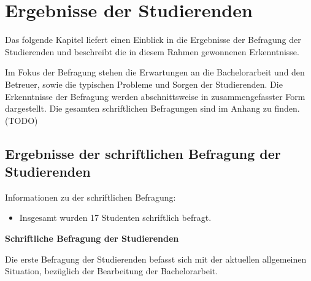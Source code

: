 \documentclass{scrreprt}
\begin{document}
\newpage
\section{Ergebnisse der Studierenden}
\par Das folgende Kapitel liefert einen Einblick in die Ergebnisse der Befragung der Studierenden und beschreibt die in diesem Rahmen gewonnenen Erkenntnisse.
\par Im Fokus der Befragung stehen die Erwartungen an die Bachelorarbeit und den Betreuer, sowie die typischen Probleme und Sorgen der Studierenden. Die Erkenntnisse der Befragung werden abschnittsweise in zusammengefasster Form dargestellt. Die gesamten schriftlichen Befragungen sind im Anhang zu finden. (TODO) 

\subsection{Ergebnisse der schriftlichen Befragung der Studierenden} \label{sub:studentenchriftlichErgebnisse}
\par Informationen zu der schriftlichen Befragung:
\begin{itemize}
\item Insgesamt wurden 17 Studenten schriftlich befragt.
\end{itemize}

\par \textbf{Schriftliche Befragung der Studierenden}
\par Die erste Befragung der Studierenden befasst sich mit der aktuellen allgemeinen Situation, bezüglich der Bearbeitung der Bachelorarbeit.
\end{document}

